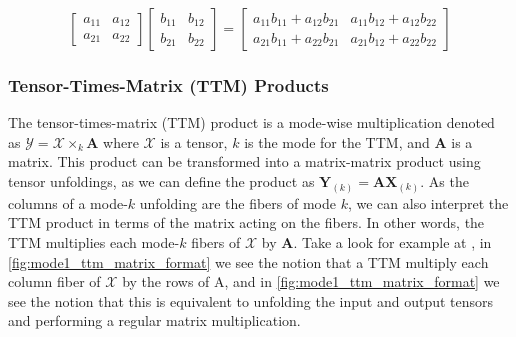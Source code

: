         \begin{equation} \label{eq:two_by_two_mat_mul}
            \left[
                \begin{array}{cc}
                    a_{11} & a_{12} \\
                    a_{21} & a_{22}
                \end{array}
            \right]
            \left[
                \begin{array}{cc}
                    b_{11} & b_{12} \\
                    b_{21} & b_{22}
                \end{array}
            \right]
            =
            \left[
                \begin{array}{cc}
                    a_{11}b_{11} + a_{12}b_{21} & a_{11}b_{12} + a_{12}b_{22} \\
                    a_{21}b_{11} + a_{22}b_{21} & a_{21}b_{12} + a_{22}b_{22}
                \end{array}
            \right]
        \end{equation}


    \subsubsection{Tensor-Times-Matrix (TTM) Products} \label{sec:Tensor-Times-Matrix Products}
        The tensor-times-matrix (TTM) product is a mode-wise multiplication
        denoted as $\mathcal{Y} = \mathcal{X}\times_k\mathbf{A}$ where
        $\mathcal{X}$ is a tensor, $k$ is the mode for the TTM, and $\mathbf{A}$
        is a matrix. This product can be transformed into a matrix-matrix
        product using tensor unfoldings, as we can define the product as
        $\mathbf{Y}_{(k)} = \mathbf{AX}_{(k)}$. As the columns of a mode-$k$
        unfolding are the fibers of mode $k$, we can also interpret the TTM
        product in terms of the matrix acting on the fibers. In other words, the
        TTM multiplies each mode-$k$ fibers of $\mathcal{X}$ by $\mathbf{A}$.
        Take a look for example at , in
        \ref{fig:mode1_ttm_matrix_format} we see the notion that a TTM multiply
        each column fiber of $\mathcal{X}$ by the rows of A, and in
        \ref{fig:mode1_ttm_matrix_format} we see the notion that this is
        equivalent to unfolding the input and output tensors and performing a
        regular matrix multiplication.

